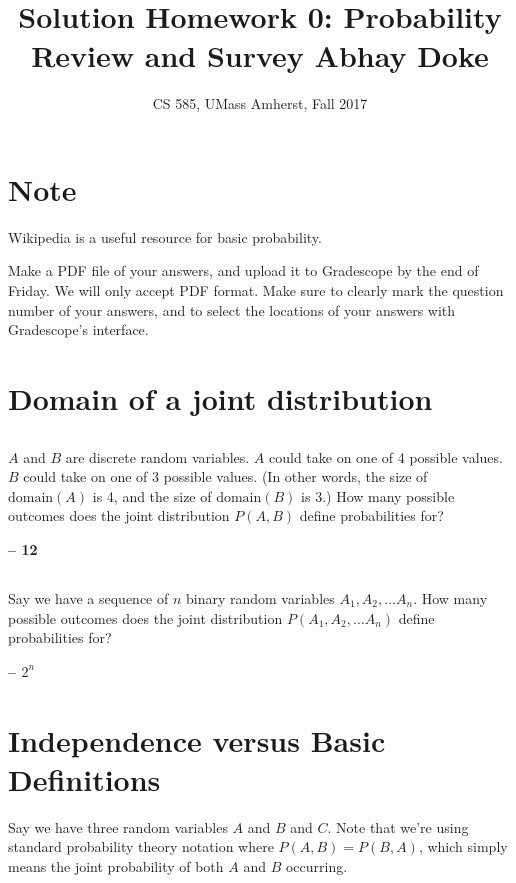 \documentclass[11pt,letterpaper]{article}
\title{
    \textbf{Solution} Homework 0: Probability Review and Survey
    Abhay Doke
}
\author{CS 585, UMass Amherst, Fall 2017}
\date{}
\theoremstyle{definition}
\begin{document}
\maketitle

\newcommand{\spaceplz}{\vspace{1in}}

\section*{Note}

Wikipedia is a useful resource for basic probability.

Make a PDF file of your answers, and upload it to Gradescope by the end of Friday.  We will only accept PDF format.  Make sure to clearly mark the question number of your answers, and to select the locations of your answers with Gradescope's interface.

\section{Domain of a joint distribution}

\subsection{}

$A$ and $B$ are discrete random variables.  $A$ could take on one of 4 possible values.  $B$ could take on one of 3 possible values.  (In other words, the size of $\text{domain}(A)$ is 4, and the size of $\text{domain}(B)$ is 3.)  How many possible outcomes does the joint distribution $P(A,B)$ define probabilities for?

\textbf{ -- 12}

\subsection{}
Say we have a sequence of $n$ binary random variables
$A_1, A_2,\ldots A_n$.  How many possible outcomes
does the joint distribution $P(A_1,A_2,\ldots A_n)$ define probabilities for?

\textbf{ -- $2^{n}$}

\section{Independence versus Basic Definitions}

Say we have three random variables $A$ and $B$ and $C$.
Note that we're using standard probability theory notation where $P(A,B)=P(B,A)$,
which simply means the joint probability of both $A$ and $B$ occurring.
\end{document}
